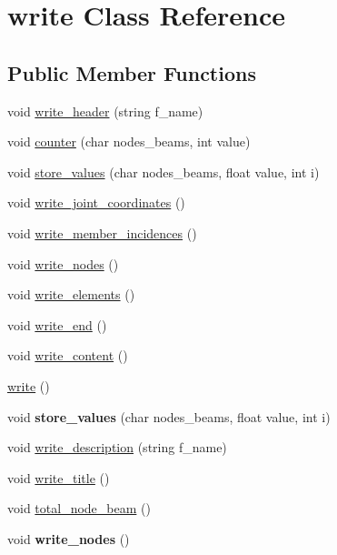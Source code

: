 \hypertarget{classwrite}{}\section{write Class Reference}
\label{classwrite}
\subsection*{Public Member Functions}
\begin{DoxyCompactItemize}
\item 
void \hyperlink{classwrite_a0bebad05af21ec9b1323fb7064162272}{write\+\_\+header} (string f\+\_\+name)
\item 
void \hyperlink{classwrite_a2f86e2e16e2f9aa1c0cd991039ade111}{counter} (char nodes\+\_\+beams, int value)
\item 
void \hyperlink{classwrite_a02004411c0591712150bac0f43d55d65}{store\+\_\+values} (char nodes\+\_\+beams, float value, int i)
\item 
void \hyperlink{classwrite_a4c014b585a22eb38553118faeb37626f}{write\+\_\+joint\+\_\+coordinates} ()
\item 
void \hyperlink{classwrite_a5404efbea6b432b6abe6f174ccb5cec1}{write\+\_\+member\+\_\+incidences} ()
\item 
void \hyperlink{classwrite_a636a690b03780f17de550a9f1ec3bdba}{write\+\_\+nodes} ()
\item 
void \hyperlink{classwrite_ac1ab221dd1e921a1d3b980504de85679}{write\+\_\+elements} ()
\item 
void \hyperlink{classwrite_ae84036c04d38bf16e0f3f808550bf02e}{write\+\_\+end} ()
\item 
void \hyperlink{classwrite_a850f72a483686a0432a9346800edc5f3}{write\+\_\+content} ()
\item 
\hyperlink{classwrite_a4ac54368979dc7adfa82cfb62c4c0e81}{write} ()
\item 
\hypertarget{classwrite_a02004411c0591712150bac0f43d55d65}{}void {\bfseries store\+\_\+values} (char nodes\+\_\+beams, float value, int i)\label{classwrite_a02004411c0591712150bac0f43d55d65}

\item 
void \hyperlink{classwrite_a06236ad67afe61496181665041127d61}{write\+\_\+description} (string f\+\_\+name)
\item 
void \hyperlink{classwrite_a01dc9ca33de6790558e55b546e370b41}{write\+\_\+title} ()
\item 
void \hyperlink{classwrite_adabae8321fb62e7ff7fd78fdcd75aee9}{total\+\_\+node\+\_\+beam} ()
\item 
\hypertarget{classwrite_a636a690b03780f17de550a9f1ec3bdba}{}void {\bfseries write\+\_\+nodes} ()\label{classwrite_a636a690b03780f17de550a9f1ec3bdba}


\end{DoxyCompactItemize}
